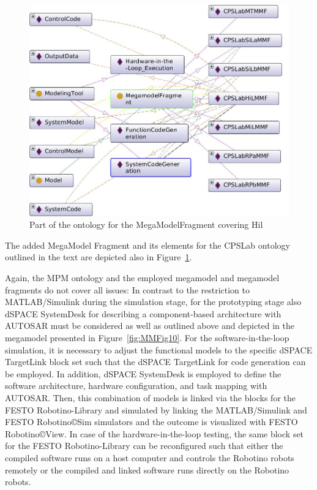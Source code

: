 

\begin{figure}[!htb]
\centering
\includegraphics[scale=0.333]{figures/CPSLabHiLMMF.jpg}
\caption{Part of the ontology for the MegaModelFragment \CPSLabHiLMMF covering Hil}
\label{fig:MMF-HPI-HiL}
\end{figure}

The added MegaModel Fragment \CPSLabHiLMMF and its elements for the CPSLab ontology outlined in the text are depicted also in Figure~\ref{fig:MMF-HPI-HiL}.


%
Again, the MPM ontology and the employed megamodel and megamodel fragments do not cover all issues: 
%
In contrast to the restriction to MATLAB/Simulink during the simulation stage, for the prototyping stage also dSPACE SystemDesk for describing a component-based architecture with AUTOSAR must be considered as well as outlined above and depicted in the megamodel presented in Figure~\ref{fig:MMFig10}.
%
For the software-in-the-loop simulation, it is necessary to adjust the functional models to the specific dSPACE TargetLink block set such that the dSPACE TargetLink for code generation can be employed. In addition, dSPACE SystemDesk is employed to define the software architecture, hardware configuration, and task mapping with AUTOSAR. Then, this combination of models is linked via the blocks for the FESTO Robotino-Library and simulated by linking the MATLAB/Simulink and FESTO Robotino{\copyright}Sim simulators and  the outcome is visualized with FESTO Robotino{\copyright}View. 
%
In case of the hardware-in-the-loop testing, the same block set for the FESTO Robotino-Library can be reconfigured such that 
%
either the compiled software runs on a host computer and controls the Robotino robots remotely
%
or the compiled and linked software runs directly on the Robotino robots.


